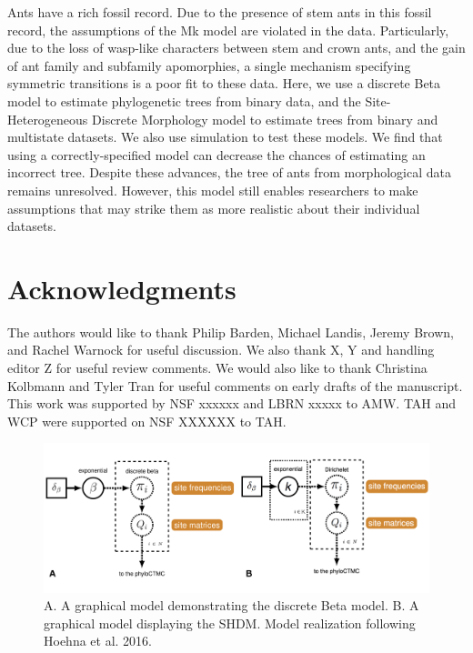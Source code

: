 \documentclass[]{sysbio}
\begin{document}
Ants have a rich fossil record.
Due to the presence of stem ants in this fossil record, the assumptions of the Mk model are violated in the data.
Particularly, due to the loss of wasp-like characters between stem and crown ants, and the gain of ant family and subfamily apomorphies, a single mechanism specifying symmetric transitions is a poor fit to these data. 
Here, we use a discrete Beta model to estimate phylogenetic trees from binary data, and the Site-Heterogeneous Discrete Morphology model to estimate trees from binary and multistate datasets.
We also use simulation to test these models. 
We find that using a correctly-specified model can decrease the chances of estimating an incorrect tree.
Despite these advances, the tree of ants from morphological data remains unresolved.
However, this model still enables researchers to make assumptions that may strike them as more realistic about their individual datasets.
\par

\section{Acknowledgments}

The authors would like to thank Philip Barden, Michael Landis, Jeremy Brown, and Rachel Warnock	 for useful discussion.
We also thank X, Y and handling editor Z for useful review comments.
We would also like to thank Christina Kolbmann and Tyler Tran for useful comments on early drafts of the manuscript.
This work was supported by NSF xxxxxx and LBRN xxxxx to AMW.
TAH and WCP were supported on NSF XXXXXX to TAH.





\begin{figure}
  \caption{A. A graphical model demonstrating the discrete Beta model. B. A graphical model displaying the SHDM. Model realization following Hoehna et al. 2016.}
    \includegraphics[width=\textwidth]{fig/1AB}
\end{figure} 
\end{document}
